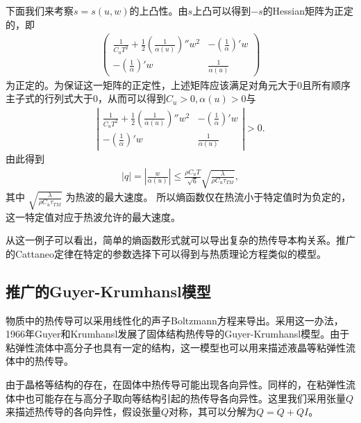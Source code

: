 下面我们来考察$s=s(u,w)$的上凸性。由$s$上凸可以得到$-s$的Hessian矩阵为正定的，即
\begin{eqnarray*}
\left( \begin{array}{ll} \frac{1}{C_u T^2}+\frac{1}{2}(\frac{1}{\alpha(u)})'' {w}^2 & -(\frac{1}{\alpha})'{w} \\ -(\frac{1}{\alpha})'{w} & \frac{1}{\alpha(u)} \end{array} \right)
\end{eqnarray*}
为正定的。为保证这一矩阵的正定性，上述矩阵应该满足对角元大于$0$且所有顺序主子式的行列式大于$0$，从而可以得到$C_u >0,
\alpha(u)>0$与
\begin{eqnarray*}
\left| \begin{array}{ll} \frac{1}{C_u T^2}+\frac{1}{2}(\frac{1}{\alpha(u)})'' {w}^2 & -(\frac{1}{\alpha})'{w} \\ -(\frac{1}{\alpha})'{w} & \frac{1}{\alpha(u)} \end{array} \right|>0.
\end{eqnarray*}
由此得到
\begin{eqnarray*}
|{q}|=\left|\frac{w}{\alpha(u)}\right| \le \frac{\rho C_u T}{\sqrt{6}} \sqrt{\frac{\lambda}{\rho C_u \tau_{TM}}},
\end{eqnarray*}
其中 $\sqrt{\frac{\lambda}{\rho C_u \tau_{TM}}}$ 为热波的最大速度\cite{jou1996extended}。 所以熵函数仅在热流小于特定值时为负定的，这一特定值对应于热波允许的最大速度。

从这一例子可以看出，简单的熵函数形式就可以导出复杂的热传导本构关系。推广的Cattaneo定律在特定的参数选择下可以得到与热质理论方程类似的模型。

\subsection{推广的Guyer-Krumhansl模型}
物质中的热传导可以采用线性化的声子Boltzmann方程来导出。采用这一办法，1966年Guyer和Krumhansl发展了固体结构热传导的Guyer-Krumhansl模型\cite{guyer1966solution}。由于粘弹性流体中高分子也具有一定的结构，这一模型也可以用来描述液晶等粘弹性流体中的热传导\cite{van2002weakly,van2005exploiting}。

由于晶格等结构的存在，在固体中热传导可能出现各向异性。同样的，在粘弹性流体中也可能存在与高分子取向等结构引起的热传导各向异性。这里我们采用张量$Q$来描述热传导的各向异性，假设张量${Q}$对称，其可以分解为${Q}=\mathring{{Q}}+\dot{Q}{I}$。

